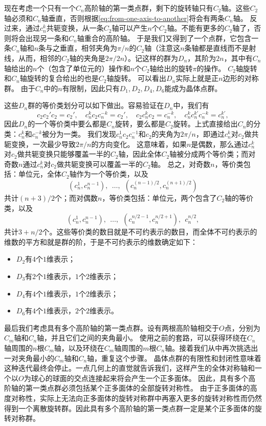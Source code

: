 现在考虑一个只有一个$C_n$高阶轴的第一类点群，剩下的旋转轴只有$C_2$轴。这些$C_2$轴必须和$C_n$轴垂直，否则根据\eqref{eq:from-one-axis-to-another}将会有两条$C_n$轴。
反过来，通过$c_n^k$共轭变换，从一条$C_2$轴可以产生$n$个$C_2$轴。不能有更多的$C_2$轴了，否则将会出现另一条和$C_n$轴重合的高阶轴。
于是我们又得到了一个点群，它包含一条$C_n$轴和$n$条与之垂直，相邻夹角为$\pi / n$的$C_2$轴（注意这$n$条轴都是直线而不是射线，从而，相邻的$C_2$轴的夹角是$2\pi/2n$）。记这样的群为$D_n$，其阶为$2n$，其中有$C_n$轴给出的$n$个（包含了单位元的）操作和$n$个$C_2$轴给出的旋转$\pi$的操作。
$C_2$轴旋转和$C_n$轴旋转的复合给出的也是$C_2$轴旋转。
可以看出$D_n$实际上就是正$n$边形的对称群。
由于$C_n$中的$n$有限制，因此只有$D_1, D_2, D_4, D_6$能成为晶体点群。

这些$D_n$群的等价类划分可以如下做出。容易验证在$D_n$中，我们有
\[
    c_2 c_2' c_2 = c_2', \quad c_n^k c_2 c_n^{-k} = c_2', \quad c_2 c_n^k c_2 = c_n^{-k}, \quad c_n^k c_n^{k'} c_n^{-k} = c_n^{k'},
\]
因此$D_n$的一个等价类中要么都是$C_n$旋转，要么都是$C_2$旋转。上式直接给出$C_n$的分类：$c_n^{k}$和$c_n^{-k}$被分为一类。
我们发现$c_n^1 c_2 c_n^{-1}$和$c_2$的夹角为$2\pi/n$，即通过$c_n^k$对$c_2$做共轭变换，一次最少导致$2\pi/n$的方向变化。
这意味着，如果$n$是偶数，那么通过$c_n^k$对$c_2$做共轭变换只能够覆盖一半的$C_2$轴，因此全体$C_2$轴被分成两个等价类；而对奇数$n$通过$c_n^k$对$c_2$做共轭变换可以覆盖一半的$C_2$轴。
总之，对奇数$n$，等价类包括：单位元，全体$C_2$轴作为一个等价类，以及
\[
    (c_n^1, c_n^{n-1}), \ \  \ldots, \ \  (c_n^{(n-1)/2}, c_n^{(n+1)/2})
\]
共计$(n+3)/2$个；而对偶数$n$，等价类包括：单位元，两个包含了$C_2$轴的等价类，以及
\[
    (c_n^1, c_n^{n-1}), \ \  \ldots, \ \  (c_n^{n/2-1}, c_n^{n/2+1}), \ \ c_n^{n/2},
\]
共计$3+n/2$个。这些等价类的数目就是不可约表示的数目，而全体不可约表示的维数的平方和就是群的阶，于是不可约表示的维数确定如下：
\begin{itemize}
    \item $D_2$有$4$个$1$维表示；
    \item $D_3$有$2$个$1$维表示，$1$个$2$维表示；
    \item $D_4$有$4$个$1$维表示，$1$个$2$维表示；
    \item $D_6$有$4$个$1$维表示，$2$个$2$维表示。
\end{itemize}

最后我们考虑具有多个高阶轴的第一类点群。设有两根高阶轴相交于$O$点，分别为$C_m$轴和$C_n$轴，并且它们之间的夹角最小。
使用之前的套路，可以获得环绕在$C_n$轴周围的$n$根$C_m$轴，以及环绕在$C_m$轴周围的$m$根$C_n$轴。接着我们从中再次挑选出一对夹角最小的$C_m$轴和$C_n$轴，重复这个步骤。
晶体点群的有限性和封闭性意味着这种迭代最终会停止。一点几何上的直觉就告诉我们，这样产生的全体对称轴和一个以$O$为球心的球面的交点连接起来将会产生一个正多面体。
因此，具有多个高阶轴的第一类点群必须包括某个正多面体的全部旋转对称性。
由于正多面体的高度对称性，实际上无法向正多面体的旋转对称群中再塞入更多的旋转对称性而仍然得到一个离散旋转群。因此具有多个高阶轴的第一类点群一定是某个正多面体的旋转对称群。

